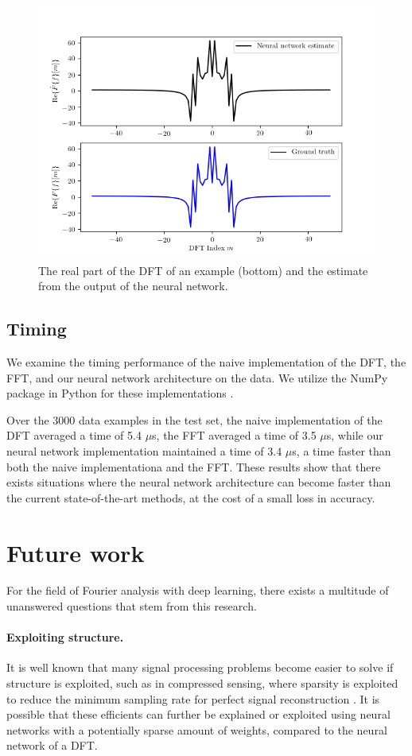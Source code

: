 \documentclass[12pt]{article}
\begin{document}
\begin{figure}
\centering
\includegraphics[scale=.75]{figures/DFT_comparisons.png}
\caption{The real part of the DFT of an example (bottom) and the estimate from the output of the neural network.}
\label{f-DFT_compare}
\end{figure}

\subsection{Timing}
We examine the timing performance of the naive implementation of the DFT, the FFT, and our neural network architecture
on the data. We utilize the NumPy package in Python for these implementations \cite{NUMPY}.

Over the 3000 data examples in the test set, the naive implementation of the DFT averaged a time of 5.4 $\mu$s,
the FFT averaged a time of 3.5 $\mu$s, while our neural network implementation maintained a time of 3.4 $\mu$s, a time
faster than both the naive implementationa and the FFT. These results show that there exists situations where the neural
network architecture can become faster than the current state-of-the-art methods, at the cost of a small loss in accuracy.

\section{Future work}
For the field of Fourier analysis with deep learning, there exists a multitude of unanswered questions that stem from 
this research.

\paragraph{Exploiting structure.} It is well known that many signal processing problems become easier to solve if structure is
exploited, such as in compressed sensing, where sparsity is exploited to reduce the minimum sampling rate for perfect signal
reconstruction \cite{D:06}. It is possible that these efficients can further be explained or exploited using neural networks
with a potentially sparse amount of weights, compared to the neural network of a DFT.
\end{document}
